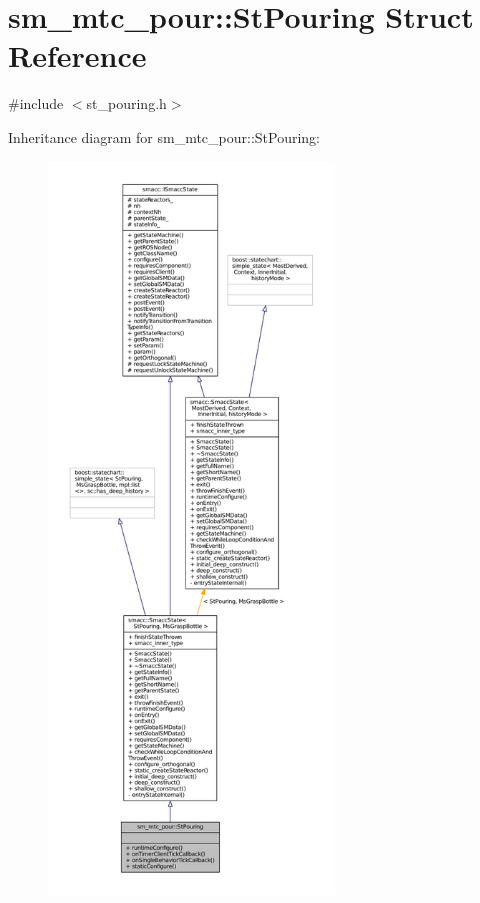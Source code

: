 \hypertarget{structsm__mtc__pour_1_1StPouring}{}\section{sm\+\_\+mtc\+\_\+pour\+:\+:St\+Pouring Struct Reference}
\label{structsm__mtc__pour_1_1StPouring}


{\ttfamily \#include $<$st\+\_\+pouring.\+h$>$}



Inheritance diagram for sm\+\_\+mtc\+\_\+pour\+:\+:St\+Pouring\+:
\nopagebreak
\begin{figure}[H]
\begin{center}
\leavevmode
\includegraphics[height=550pt]{structsm__mtc__pour_1_1StPouring__inherit__graph}
\end{center}
\end{figure}


